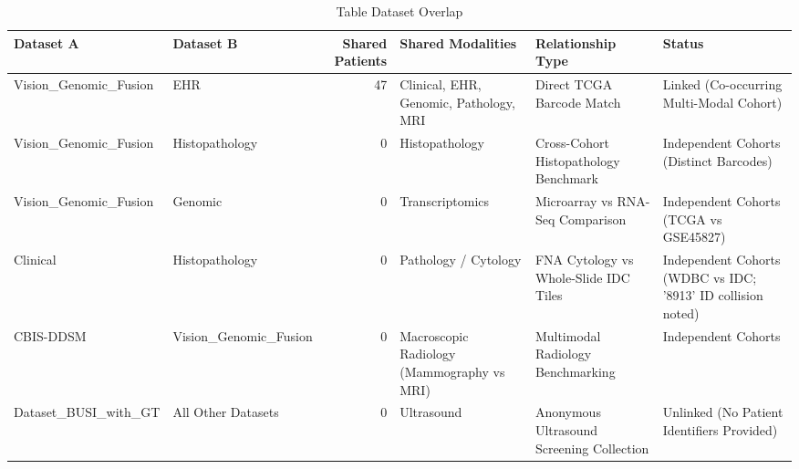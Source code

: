 \begin{table}
\caption{Table Dataset Overlap}
\begin{tabular}{llrlll}
\toprule
Dataset A & Dataset B & Shared Patients & Shared Modalities & Relationship Type & Status \\
\midrule
Vision_Genomic_Fusion & EHR & 47 & Clinical, EHR, Genomic, Pathology, MRI & Direct TCGA Barcode Match & Linked (Co-occurring Multi-Modal Cohort) \\
Vision_Genomic_Fusion & Histopathology & 0 & Histopathology & Cross-Cohort Histopathology Benchmark & Independent Cohorts (Distinct Barcodes) \\
Vision_Genomic_Fusion & Genomic & 0 & Transcriptomics & Microarray vs RNA-Seq Comparison & Independent Cohorts (TCGA vs GSE45827) \\
Clinical & Histopathology & 0 & Pathology / Cytology & FNA Cytology vs Whole-Slide IDC Tiles & Independent Cohorts (WDBC vs IDC; '8913' ID collision noted) \\
CBIS-DDSM & Vision_Genomic_Fusion & 0 & Macroscopic Radiology (Mammography vs MRI) & Multimodal Radiology Benchmarking & Independent Cohorts \\
Dataset_BUSI_with_GT & All Other Datasets & 0 & Ultrasound & Anonymous Ultrasound Screening Collection & Unlinked (No Patient Identifiers Provided) \\
\bottomrule
\end{tabular}
\end{table}

